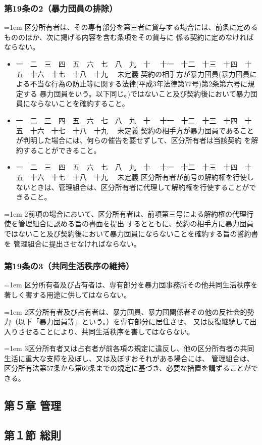 \documentclass[
  luatex,
  paper=a4paper,
  fontsize=11pt,
  jafontsize=11pt,
  jlreq_notes,
]{jlreq}
\newcommand{\joumain}[1]{%
  \noindent\hangindent=1em\hangafter=1
  \hspace{1em}#1%
}
\newcommand{\kou}[2]{%
  \par\noindent\hangindent=1em\hangafter=1
  #1\hspace{1em}#2%
}
\def\toKansuji#1{
  \tempvls=#1
  \ifcase\tempvls
    \or 一　\or 二　\or 三　\or 四　\or 五　\or 六　\or 七　\or 八　\or 九　\or 十　
    \or 十一　\or 十二　\or 十三　\or 十四　\or 十五　\or 十六　\or 十七　\or 十八　\or 十九　
  \else 未定義
  \fi
}
\begin{document}
  \subsubsection*{第19条の2（暴力団員の排除）}
  \joumain{区分所有者は、その専有部分を第三者に貸与する場合には、前条に定めるもののほか、次に掲げる内容を含む条項をその貸与に
  係る契約に定めなければならない。}
  \begin{itemize}[label={}, leftmargin=3em, itemindent=-2em]
    \item \toKansuji{1}契約の相手方が暴力団員(暴力団員による不当な行為の防止等に関する法律(平成3年法律第77号)第2条第六号に規定する
    暴力団員をいう。以下同じ。)ではないこと及び契約後において暴力団員にならないことを確約すること。
    \item \toKansuji{2}契約の相手方が暴力団員であることが判明した場合には、何らの催告を要せずして、区分所有者は当該契約
    を解約することができること。
    \item \toKansuji{3}区分所有者が前号の解約権を行使しないときは、管理組合は、区分所有者に代理して解約権を行使することができること。
  \end{itemize}
  \kou{2}{前項の場合において、区分所有者は、前項第三号による解約権の代理行使を管理組合に認める旨の書面を提出
  するとともに、契約の相手方に暴力団員ではないこと及び契約後において暴力団員にならないことを確約する旨の誓約書を
  管理組合に提出させなければならない。}

  \subsubsection*{第19条の3（共同生活秩序の維持）}
  \joumain{区分所有者及び占有者は、専有部分を暴力団事務所その他共同生活秩序を著しく害する用途に供してはならない。}
  \kou{2}{区分所有者及び占有者は、暴力団員、暴力団関係者その他の反社会的勢力（以下「暴力団員等」という。）を専有部分に居住させ、
  又は反復継続して出入りさせることにより、共同生活秩序を害してはならない。}
  \kou{3}{区分所有者又は占有者が前各項の規定に違反し、他の区分所有者の共同生活に重大な支障を及ぼし、又は及ぼすおそれがある場合には、
  管理組合は、区分所有法第57条から第60条までの規定に基づき、必要な措置を講ずることができる。}
  \begin{center}
  \subsection*{第５章 管理}
  \subsection*{第１節 総則}
  \end{center}
\end{document}
